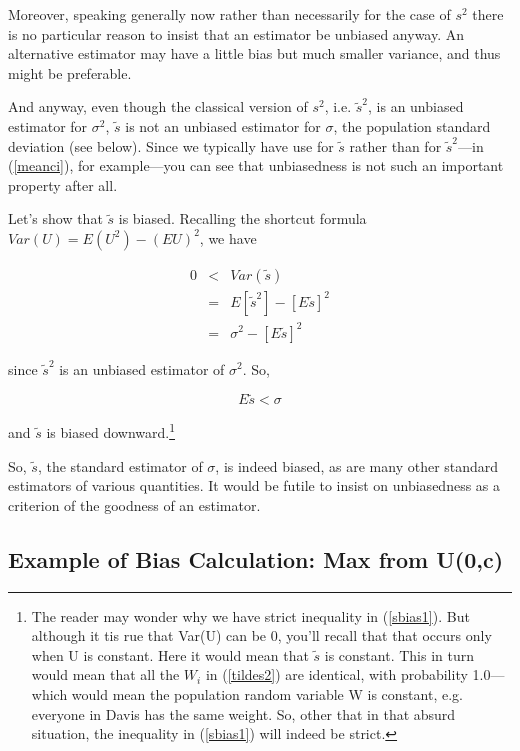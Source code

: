 Moreover, speaking generally now rather than necessarily for the case of
$s^2$ there is no particular reason to insist that an estimator be
unbiased anyway.  An alternative estimator may have a little bias but
much smaller variance, and thus might be preferable.  

And anyway, even though the classical version of $s^2$, i.e.
$\tilde{s}^2$, is an unbiased estimator for $\sigma^2$, $\tilde{s}$ is
not an unbiased estimator for $\sigma$, the population standard
deviation (see below).  Since we typically have use for $\tilde{s}$
rather than for $\tilde{s}^2$---in (\ref{meanci}), for example---you can
see that unbiasedness is not such an important property after all.

Let's show that $\tilde{s}$ is biased.  Recalling the shortcut
formula $Var(U) = E(U^2) - (EU)^2$, we have

\begin{eqnarray}
0 &<& Var(\tilde{s}) \label{sbias1} \\ 
&=& E[\tilde{s}^2] - [E\tilde{s}]^2    \\
&=& \sigma^2 - [E\tilde{s}]^2 \label{sbias2}
\end{eqnarray}

since $\tilde{s}^2$ is an unbiased estimator of $\sigma^2$.  So,

\begin{equation}
E\tilde{s} < \sigma
\end{equation}

and $\tilde{s}$ is biased downward.\footnote{The reader may wonder why
we have strict inequality in (\ref{sbias1}).   But although it tis rue
that Var(U) can be 0, you'll recall that that occurs only when
U is constant.  Here it would mean that $\tilde{s}$ is constant.  This
in turn would mean that all the $W_i$ in (\ref{tildes2}) are identical,
with probability 1.0---which would mean the population random variable W
is constant, e.g. everyone in Davis has the same weight.  So, other that
in that absurd situation, the inequality in (\ref{sbias1}) will indeed
be strict.}

So, $\tilde{s}$, the standard estimator of $\sigma$, is indeed biased, as
are many other standard estimators of various quantities.  It would be
futile to insist on unbiasedness as a criterion of the goodness of an
estimator.

\subsection{Example of Bias Calculation:  Max from U(0,c)}

